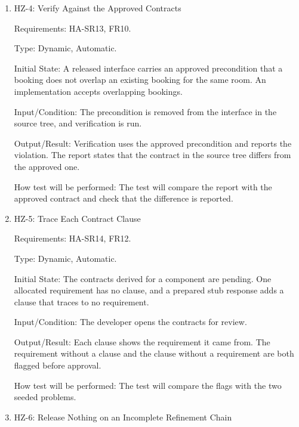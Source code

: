 \documentclass[12pt, titlepage]{article}
\begin{document}
\begin{enumerate}
Output/Result: The check uses the newer model and reports the violation. The report lists
what was checked and states that behaviour outside the checked requirements was not
verified.

How test will be performed: The test will compare the report with the newer constraint
set and check for the limitation statement.

\item{HZ-4: Verify Against the Approved Contracts\\}

Requirements: HA-SR13, FR10.

Type: Dynamic, Automatic.

Initial State: A released interface carries an approved precondition that a booking
does not overlap an existing booking for the same room. An implementation accepts
overlapping bookings.

Input/Condition: The precondition is removed from the interface in the source tree,
and verification is run.

Output/Result: Verification uses the approved precondition and reports the violation.
The report states that the contract in the source tree differs from the approved one.

How test will be performed: The test will compare the report with the approved
contract and check that the difference is reported.

\item{HZ-5: Trace Each Contract Clause\\}

Requirements: HA-SR14, FR12.

Type: Dynamic, Automatic.

Initial State: The contracts derived for a component are pending. One allocated
requirement has no clause, and a prepared stub response adds a clause that traces to
no requirement.

Input/Condition: The developer opens the contracts for review.

Output/Result: Each clause shows the requirement it came from. The requirement without
a clause and the clause without a requirement are both flagged before approval.

How test will be performed: The test will compare the flags with the two seeded
problems.

\item{HZ-6: Release Nothing on an Incomplete Refinement Chain\\}


\end{enumerate}
\end{document}

